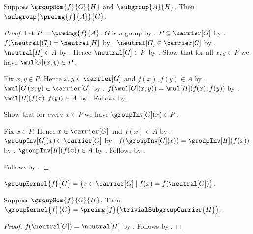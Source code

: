 \begin{theorem}\label{group_hom_subgroup_preimage}
    Suppose $\groupHom{f}{G}{H}$ and $\subgroup{A}{H}$.
    Then $\subgroup{\preimg{f}{A}}{G}$.
\end{theorem}
\begin{proof}
    Let $P=\preimg{f}{A}$.
    $G$ is a group by .
    $P\subseteq\carrier[G]$ by
        .
    $f(\neutral[G])=\neutral[H]$ by
        .
    $\neutral[G]\in\carrier[G]$ by
        .
    $\neutral[H]\in A$ by .
    Hence $\neutral[G]\in P$ by
        .
    Show that for all $x,y\in P$ we have $\mul[G](x,y)\in P$.
    \begin{subproof}
        Fix $x,y\in P$.
        Hence $x,y\in\carrier[G]$ and $f(x),f(y)\in A$ by
            .
        $\mul[G](x,y)\in\carrier[G]$ by
            .
        $f(\mul[G](x,y))=\mul[H](f(x),f(y))$ by
            .
        $\mul[H](f(x),f(y))\in A$ by
            .
        Follows by .
    \end{subproof}
    Show that for every $x\in P$ we have $\groupInv[G](x)\in P$.
    \begin{subproof}
        Fix $x\in P$.
        Hence $x\in\carrier[G]$ and $f(x)\in A$ by
            .
        $\groupInv[G](x)\in\carrier[G]$ by
            .
        $f(\groupInv[G](x))=\groupInv[H](f(x))$ by
            .
        $\groupInv[H](f(x))\in A$ by .
        Follows by .
    \end{subproof}
    Follows by .
\end{proof}

\begin{definition}\label{group_kernel}
    $\groupKernel{f}{G}=
        \{x\in\carrier[G]\mid f(x)=f(\neutral[G])\}$.
\end{definition}

\begin{proposition}\label{group_kernel_target_preimage}
    Suppose $\groupHom{f}{G}{H}$.
    Then $\groupKernel{f}{G}=
        \preimg{f}{\trivialSubgroupCarrier{H}}$.
\end{proposition}
\begin{proof}
    $f(\neutral[G])=\neutral[H]$ by .
    Follows by
        .
\end{proof}

